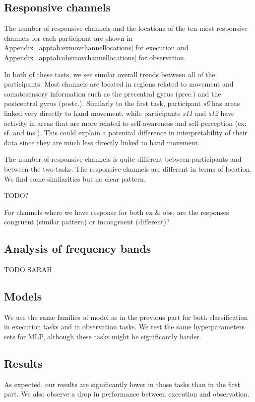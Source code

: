 \documentclass[10pt,conference,compsocconf]{IEEEtran}
\newcommand{\aref}[1]{\hyperref[#1]{Appendix~\ref*{#1}}}
\begin{document}
\subsection{Responsive channels}
The number of responsive channels and the locations of the ten most responsive channels for each participant are shown in \aref{apptab:exmovchannellocations} for execution and \aref{apptab:obsmovchannellocations} for observation.

In both of these tasts, we see similar overall trends between all of the participants. Most channels are located in regions related to movement and somatosensory information such as the precentral gyrus (prec.) and the postcentral gyrus (postc.). Similarly to the first task, participant \textit{s6} has areas linked very directly to hand movement, while participants \textit{s11} and \textit{s12} have activity in areas that are more related to self-awareness and self-perception (ex: sf. and ins.). This could explain a potential difference in interpretability of their data since they are much less directly linked to hand movement.

The number of responsive channels is quite different between participants and between the two tasks. The responsive channels are different in terms of location. We find some similarities but no clear pattern.

TODO?

For channels where we have response for both ex \& obs, are the responses congruent (similar pattern) or incongruent (different)?

\subsection{Analysis of frequency bands}
TODO SARAH

\subsection{Models}
We use the same families of model as in the previous part for both classification in execution tasks and in observation tasks. We test the same hyperparameters sets for MLP, although these tasks might be significantly harder.

\subsection{Results}
As expected, our results are significantly lower in those tasks than in the first part. We also observe a drop in performance between execution and observation.
\end{document}
